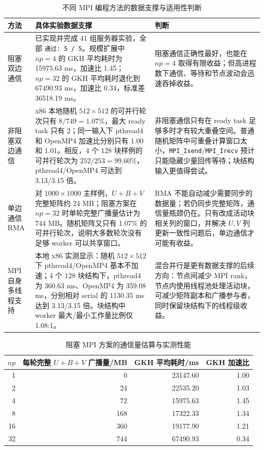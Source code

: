 \documentclass[UTF8,a4paper,10pt,fontset=windows]{ctexart}
\begin{document}
\begin{table}[H]
\centering
\scriptsize
\begin{tabular}{p{}p{}p{}}
\toprule
方法 & 具体实验数据支撑 & 判断\\
\midrule
阻塞双边通信 &
已实现并完成 41 组服务器实验，全部 \texttt{通过: 5 / 5}。规模扩展中 $np=4$ 的 GKH 平均耗时为 15975.63 ms，加速比 1.45；$np=32$ 的 GKH 平均耗时退化到 67490.93 ms，加速比 0.34，标准差 36518.19 ms。 &
阻塞通信正确性最好，也能在 $np=4$ 取得有限收益；但高进程数下通信、等待和节点波动会迅速吞掉收益。\\
\midrule
非阻塞双边通信 &
x86 本地随机 $512\times512$ 的可并行轮次只有 $8/749=1.07\%$，最大 ready task 只有 2；同一输入下 pthread4 和 OpenMP4 加速比分别只有 1.00 和 1.01。相反，4 个 $128$ 块样例的可并行轮次为 $252/253=99.60\%$，pthread4/OpenMP4 可达到 3.13/3.15 倍。 &
非阻塞通信只有在 ready task 足够多时才有较大重叠空间。普通随机矩阵中可重叠计算窗口太小，\texttt{MPI\_Isend}/\texttt{MPI\_Irecv} 预计只能隐藏少量回传等待；块结构输入更值得尝试。\\
\midrule
单边通信 RMA &
对 $1000\times1000$ 主样例，$U+B+V$ 完整矩阵约 24 MB；阻塞方案在 $np=32$ 时单轮完整广播量估计为 744 MB。随机矩阵又只有 1.07\% 的可并行轮次，说明大多数轮次没有足够 worker 可以共享窗口。 &
RMA 不能自动减少需要同步的数据量；若仍同步完整矩阵，通信量瓶颈仍在。只有改成活动块相关列的窗口，并解决 $U,V$ 列更新一致性问题后，单边通信才可能有收益。\\
\midrule
MPI 自身多线程支持 &
本地 x86 实测显示：随机 $512\times512$ 下 pthread4/OpenMP4 基本不加速；4 个 $128$ 块结构下，pthread4 为 360.63 ms、OpenMP4 为 359.08 ms，分别相对 serial 的 1130.35 ms 达到 3.13/3.15 倍。块结构中 worker 最大/最小工作量比例仅 1.08:1。 &
混合并行是更有数据支撑的后续方向：节点间减少 MPI rank，节点内使用线程池处理活动块，可减少矩阵副本和广播参与者，同时保留块结构下的线程级收益。\\
\bottomrule
\end{tabular}
\caption{不同 MPI 编程方法的数据支撑与适用性判断}
\label{tab:mpi-methods}
\end{table}

\begin{table}[H]
\centering
\small
\begin{tabular}{rrrr}
\toprule
$np$ & 每轮完整 $U+B+V$ 广播量/MB & GKH 平均耗时/ms & GKH 加速比\\
\midrule
1 & 0 & 23147.60 & 1.00\\
2 & 24 & 22535.20 & 1.03\\
4 & 72 & 15975.63 & 1.45\\
8 & 168 & 17322.33 & 1.34\\
16 & 360 & 19177.90 & 1.21\\
32 & 744 & 67490.93 & 0.34\\
\bottomrule
\end{tabular}
\caption{阻塞 MPI 方案的通信量估算与实测性能}
\label{tab:mpi-comm-evidence}
\end{table}
\end{document}
